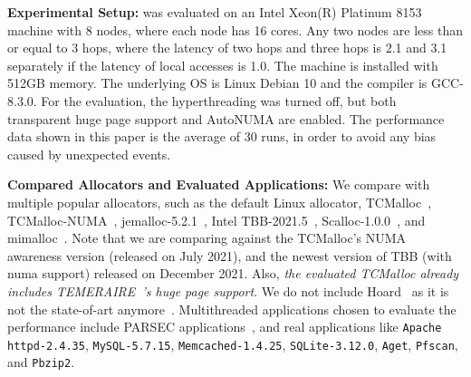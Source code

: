 \textbf{Experimental Setup:}  \NM{} was evaluated on an Intel Xeon(R) Platinum 8153 machine with 8 nodes, where each node has 16 cores. Any two nodes are less than or equal to 3 hops, where the latency of two hops and three hops is 2.1 and 3.1 separately if the latency of local accesses is 1.0. The machine is installed with 512GB memory. The underlying OS is Linux Debian 10 and the compiler is GCC-8.3.0. For the evaluation, the hyperthreading was turned off, but both transparent huge page support and AutoNUMA are  enabled. The performance data shown in this paper is the average of 30 runs, in order to avoid any bias caused by unexpected events.  

\textbf{Compared Allocators and Evaluated Applications: }  We compare \NM{} with multiple popular allocators, such as the default Linux allocator, TCMalloc~\cite{tcmalloc2},  TCMalloc-NUMA~\cite{tcmallocnew}, jemalloc-5.2.1~\cite{jemalloc}, Intel TBB-2021.5~\cite{tbb2}, Scalloc-1.0.0~\cite{Scalloc}, and mimalloc~\cite{mimalloc}. Note that we are comparing against the TCMalloc's NUMA awareness version (released on July 2021), and the newest version of TBB (with numa support) released on December 2021. Also, \textit{the evaluated TCMalloc already includes TEMERAIRE~\cite{TEMERAIRE}'s huge page support}.  
We do not include Hoard~\cite{Hoard} as it is not the state-of-art anymore~\cite{Scalloc, mimalloc}. Multithreaded applications chosen to evaluate the performance include PARSEC applications~\cite{parsec}, and real applications like \texttt{Apache httpd-2.4.35}, \texttt{MySQL-5.7.15}, \texttt{Memcached-1.4.25}, \texttt{SQLite-3.12.0}, \texttt{Aget}, \texttt{Pfscan}, and \texttt{Pbzip2}. 

